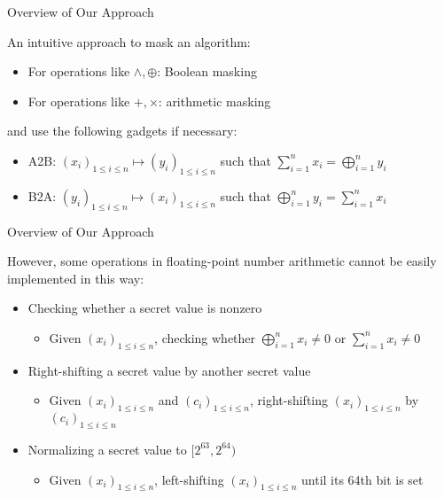 \begin{frame}{Overview of Our Approach}

An intuitive approach to mask an algorithm:
\pause

\begin{itemize}
\item For operations like $\wedge, \oplus$: Boolean masking
\pause
\item For operations like $+, \times$: arithmetic masking
\end{itemize}
\pause
and use the following gadgets if necessary:
\pause
\begin{itemize}
	\item {\sf A2B}: $(x_i)_{1\leq i \leq n} \mapsto (y_i)_{1\leq i \leq n}$ such that $\sum_{i=1}^n x_i = \bigoplus_{i=1}^n y_i$
	\pause
	\item {\sf B2A}: $(y_i)_{1\leq i \leq n} \mapsto (x_i)_{1\leq i \leq n}$ such that $\bigoplus_{i=1}^n y_i = \sum_{i=1}^n x_i$
\end{itemize}

\end{frame}


\begin{frame}{Overview of Our Approach}

However, some operations in floating-point number arithmetic cannot be easily implemented in this way:
\pause
\begin{itemize}
	\item Checking whether a secret value is nonzero
	\begin{itemize}
		\item Given $(x_i)_{1\leq i \leq n}$, checking whether $\bigoplus_{i=1}^n x_i \neq 0$ or $\sum_{i=1}^n x_i \neq 0$
	\end{itemize}
	\pause
	\item Right-shifting a secret value by another secret value
	\begin{itemize}
		\item Given $(x_i)_{1\leq i \leq n}$ and $(c_i)_{1\leq i \leq n}$, right-shifting $(x_i)_{1\leq i \leq n}$ by $(c_i)_{1\leq i \leq n}$
	\end{itemize}
	\pause
	\item Normalizing a secret value to $[2^{63},2^{64})$
	\begin{itemize}
		\item Given $(x_i)_{1\leq i \leq n}$, left-shifting $(x_i)_{1\leq i \leq n}$ until its 64th bit is set
	\end{itemize}
\end{itemize}

\end{frame}

